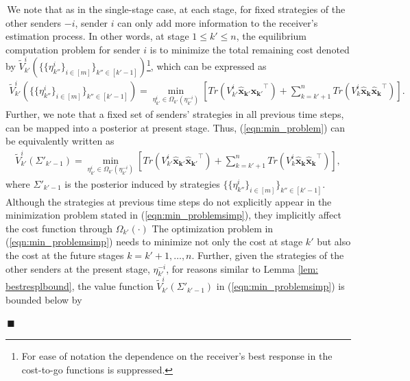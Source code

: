 \documentclass[12pt,journal,onecolumn]{IEEEtran}
\newenvironment{Proof}[1]{\medskip\par\noindent{\bf Proof:\,}\,#1}{{\mbox{\,$\blacksquare$}\par}}
\newcommand{\mbnote}[1]{\noindent{\leavevmode\color{blue}[Melih -- #1]}}
\begin{document}
\begin{Proof}
We note that as in the single-stage case, at each stage, for fixed strategies of the other senders $-i$, sender $i$ can only add more information to the receiver's estimation process. In other words, at stage $1\leq k'\leq n$, the equilibrium computation problem for sender $i$ is to minimize the total remaining cost denoted by $ \tilde{V}_{k'}^{i}(\{\{\eta^i_{k''}\}_{i\in[m]}\}_{k''\in[k'-1]})$\footnote{For ease of notation the dependence on the receiver's best response in the cost-to-go functions is suppressed.}, which can be expressed as 
\begin{align}\label{eqn:min_problem}
    \tilde{V}^i_{k'}(\{\{\eta^i_{k''}\}_{i\in[m]}\}_{k''\in[k'-1]})=\min_{\eta^i_{k'}\in\Omega_{k'}(\eta^{-i}_{k'})}\left[Tr(V^i_{k'}\boldsymbol{\hat{x}_{k'}}\boldsymbol{\hat{x}_{k'}}^\top)+\sum_{k=k'+1}^{n} Tr(V^i_{k}\boldsymbol{\hat{x}_k}\boldsymbol{\hat{x}_k}^\top)\right].
\end{align}
Further, we note that a fixed set of senders' strategies in all previous time steps, can be mapped into a posterior at present stage. Thus, (\ref{eqn:min_problem}) can be equivalently written as
\begin{align}\label{eqn:min_problemsimp}
    \tilde{V}^i_{k'}(\Sigma'_{k'-1})=\min_{\eta^i_{k'}\in\Omega_{k'}(\eta^{-i}_{k'})}\left[Tr(V^i_{k'}\boldsymbol{\hat{x}_{k'}}\boldsymbol{\hat{x}_{k'}}^\top)+\sum_{k=k'+1}^{n} Tr(V^i_{k}\boldsymbol{\hat{x}_k}\boldsymbol{\hat{x}_k}^\top)\right], 
\end{align}
where $\Sigma'_{k'-1}$ is the posterior induced by strategies $\{\{\eta^i_{k''}\}_{i\in[m]}\}_{k''\in[k'-1]}$. Although the strategies at previous time steps do not explicitly appear in the minimization problem stated in (\ref{eqn:min_problemsimp}), they implicitly affect the cost function through $\Omega_{k'}(\cdot)$
The optimization problem in (\ref{eqn:min_problemsimp}) needs to minimize not only the cost at stage $k'$ but also the cost at the future stages $k= k'+1,\dots,n$. Further, given the strategies of the other senders at the present stage, $\eta^{-i}_{k'}$, for reasons similar to Lemma \ref{lem: bestresplbound}, the value function $\tilde{V}_{k'}^i(\Sigma'_{k'-1})$ in (\ref{eqn:min_problemsimp}) is bounded below by 

\end{Proof}
\end{document}
